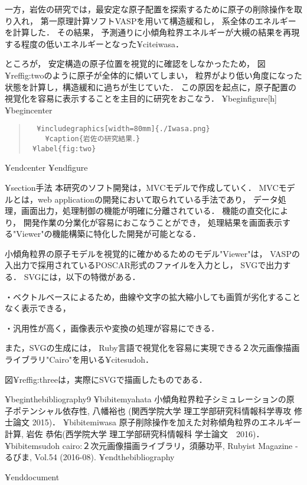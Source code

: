 \documentclass[12pt,a4paper]{jsarticle}
\begin{document}
一方，岩佐の研究では，最安定な原子配置を探索するために原子の削除操作を取り入れ，
第一原理計算ソフトVASPを用いて構造緩和し，
系全体のエネルギーを計算した．
その結果，
予測通りに小傾角粒界エネルギーが大槻の結果を再現する程度の低いエネルギーとなった¥cite{iwasa}．

ところが，
安定構造の原子位置を視覚的に確認をしなかったため，
図¥ref{fig:two}のように原子が全体的に傾いてしまい，
粒界がより低い角度になった状態を計算し，構造緩和に過ちが生じていた．
この原因を起点に，原子配置の視覚化を容易に表示することを主目的に研究をおこなう．
¥begin{figure}[h]
¥begin{center}
\begin{quote}\begin{verbatim}
  ¥includegraphics[width=80mm]{./Iwasa.png}
    ¥caption{岩佐の研究結果．}
 ¥label{fig:two}
\end{verbatim}\end{quote}
¥end{center}
¥end{figure}

¥section{手法}
本研究のソフト開発は，MVCモデルで作成していく．
MVCモデルとは，web applicationの開発において取られている手法であり，
データ処理，画面出力，処理制御の機能が明確に分離されている．
機能の直交化により，
開発作業の分業化が容易におこなうことができ， 
処理結果を画面表示する"Viewer"の機能構築に特化した開発が可能となる．

小傾角粒界の原子モデルを視覚的に確かめるためのモデル"Viewer"は，
VASPの入出力で採用されているPOSCAR形式のファイルを入力とし，
SVGで出力する．
SVGには，以下の特徴がある．

・ベクトルベースによるため，曲線や文字の拡大縮小しても画質が劣化することなく表示できる，

・汎用性が高く，画像表示や変換の処理が容易にできる．

また，SVGの生成には，
Ruby言語で視覚化を容易に実現できる２次元画像描画ライブラリ"Cairo"を用いる¥cite{sudoh}．

図¥ref{fig:three}は，実際にSVGで描画したものである．

¥begin{thebibliography}{9}
¥bibitem{yahata} 小傾角粒界粒子シミュレーションの原子ポテンシャル依存性, 八幡裕也 (関西学院大学 理工学部研究科情報科学専攻 修士論文 2015)．
¥bibitem{iwasa} 原子削除操作を加えた対称傾角粒界のエネルギー計算, 岩佐 恭佑(西学院大学 理工学部研究科情報科 学士論文　2016)． 
¥bibitem{sudoh} cairo:２次元画像描画ライブラリ，須藤功平, Rubyist Magazine - るびま, Vol.54 (2016-08).
¥end{thebibliography}

¥end{document}
\end{document}
